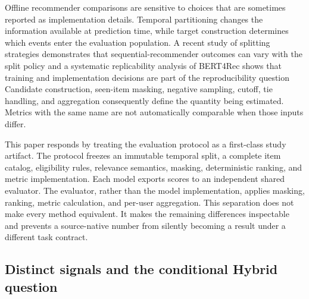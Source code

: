 Offline recommender comparisons are sensitive to choices that are sometimes
reported as implementation details. Temporal partitioning changes the
information available at prediction time, while target construction determines
which events enter the evaluation population. A recent study of splitting
strategies demonstrates that sequential-recommender outcomes can vary with the
split policy
\cite{gusak2025_time_split} %
and a systematic replicability analysis of BERT4Rec shows that training and
implementation decisions are part of the reproducibility question
\cite{petrov2022_a_systematic_review_and_replicability_study_of_bert4rec_fo} %
Candidate construction, seen-item masking, negative sampling, cutoff, tie
handling, and aggregation consequently define the quantity being estimated.
Metrics with the same name are not automatically comparable when those inputs
differ.

This paper responds by treating the evaluation protocol as a first-class study
artifact. The protocol freezes an immutable temporal split, a complete item
catalog, eligibility rules, relevance semantics, masking, deterministic ranking,
and metric implementation. Each model exports scores to an independent shared
evaluator. The evaluator, rather than the model implementation, applies
masking, ranking, metric calculation, and per-user aggregation. This separation
does not make every method equivalent. It makes the remaining differences
inspectable and prevents a source-native number from silently becoming a result
under a different task contract.

\subsection{Distinct signals and the conditional Hybrid question}

